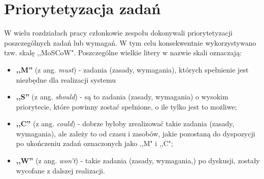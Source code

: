 \section{Priorytetyzacja zadań}
W wielu rozdziałach pracy członkowie zespołu dokonywali priorytetyzacji
poszczególnych zadań lub wymagań. W tym celu konsekwentnie wykorzystywano tzw.
skalę ,,MoSCoW". Poszczególne wielkie litery w nazwie skali oznaczają:

\begin{itemize}
	\item \textbf{,,M''} (z ang. \textit{must}) - zadania (zasady,
  wymagania), których spełnienie jest niezbędne dla realizacji systemu
	\item \textbf{,,S''} (z ang. \textit{should}) - są to zadania
  (zasady, wymagania) o wysokim priorytecie, które powinny
	zostać spełnione, o ile tylko jest to możliwe;
	\item \textbf{,,C''} (z ang. \textit{could}) - dobrze byłoby zrealizować takie zadania (zasady, wymagania), ale zależy to od czasu
	i zasobów, jakie pozostaną do dyspozycji po ukończeniu zadań oznaczonych jako ,,M" i ,,C";
	\item \textbf{,,W''} (z ang. \textit{won't}) - takie zadania (zasady, wymagania,) po dyskusji, zostały wycofane z dalszej realizacji.
\end{itemize}


